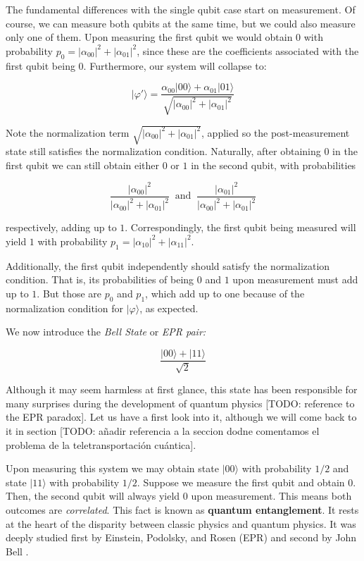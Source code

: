 \documentclass{article}
\begin{document}
	The fundamental differences with the single qubit case start on measurement. Of course, we can measure both qubits at the same time, but we could also measure only one of them. Upon measuring the first qubit we would obtain $0$ with probability $p_0 = |\alpha_{00}|^2 + |\alpha_{01}|^2$, since these are the coefficients associated with the first qubit being $0$. Furthermore, our system will collapse to:
	
	$$ |\varphi'\rangle = \frac{ \alpha_{00} |00\rangle + \alpha_{01} |01\rangle }{ \sqrt{|\alpha_{00}|^2 + |\alpha_{01}|^2} } $$
	
	Note the normalization term $\sqrt{|\alpha_{00}|^2 + |\alpha_{01}|^2}$, applied so the post-measurement state still satisfies the normalization condition. Naturally, after obtaining $0$ in the first qubit we can still obtain either $0$ or $1$ in the second qubit, with probabilities 
	
	$$ \frac{ |\alpha_{00}|^2 }{ |\alpha_{00}|^2 + |\alpha_{01}|^2 }  \ \text{ and } \ 
	\frac{ |\alpha_{01}|^2 }{ |\alpha_{00}|^2 + |\alpha_{01}|^2 } $$
	
	respectively, adding up to $1$. Correspondingly, the first qubit being measured will yield $1$ with probability $p_1 = |\alpha_{10}|^2 + |\alpha_{11}|^2$.
	
	Additionally, the first qubit independently should satisfy the normalization condition. That is, its probabilities of being $0$ and $1$ upon measurement must add up to $1$. But those are $p_0$ and $p_1$, which add up to one because of the normalization condition for $|\varphi\rangle$, as expected.
	
	We now introduce the \emph{Bell State} or \emph{EPR pair:}
	
	$$ \frac{ |00\rangle + |11\rangle }{ \sqrt 2 } $$
	
	Although it may seem harmless at first glance, this state has been responsible for many surprises during the development of quantum physics [TODO: reference to the EPR paradox]. Let us have a first look into it, although we will come back to it in section [TODO: añadir referencia a la seccion dodne comentamos el problema de la teletransportación cuántica].
	
	Upon measuring this system we may obtain state $|00\rangle$ with probability $1/2$ and state $|11\rangle$ with probability $1/2$. Suppose we measure the first qubit and obtain $0$. Then, the second qubit will always yield $0$ upon measurement. This means both outcomes are \emph{correlated}. This fact is known as \textbf{quantum entanglement}. It rests at the heart of the disparity between classic physics and quantum physics. It was deeply studied first by Einstein, Podolsky, and Rosen (EPR) \cite{Einstein1935} and second by John Bell \cite{Bellt1964}.
	
\end{document}
